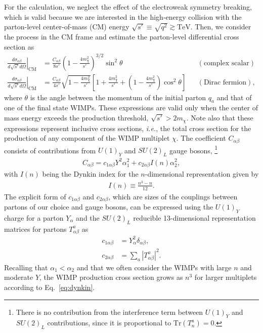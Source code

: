 \documentclass[12pt,twoside,book]{article}
\begin{document}
For the calculation, we neglect the effect of the electroweak symmetry breaking, which is valid because we are interested in the high-energy collision with the parton-level center-of-mass (CM) energy $\sqrt{s'} \equiv \sqrt{q^2} \gtrsim \mathrm{TeV}$.
Then, we consider the process in the CM frame and estimate the parton-level differential cross section as
\begin{align}
  \left. \frac{d \sigma_{\alpha \beta}}{d \sqrt{s'} d \Omega} \right|_{\text{CM}}
  &= \frac{C_{\alpha \beta}}{8 s'} \left( 1 - \frac{4 m_\chi^2}{s'} \right)^{3/2} \sin^2 \theta
  & &(\text{complex scalar}) \label{eq:parton_cross_section_scalar} \\
  \left. \frac{d \sigma_{\alpha \beta}}{d \sqrt{s'} d \Omega} \right|_{\text{CM}}
  &= \frac{C_{\alpha \beta}}{4 s'} \sqrt{1 - \frac{4 m_\chi^2}{s'}}
  \left[ 1 + \frac{4 m_\chi^2}{s'} + \left( 1 - \frac{4 m_\chi^2}{s'} \right) \cos^2 \theta \right]
  & &(\text{Dirac fermion}), \label{eq:parton_cross_section_fermion}
\end{align}
where $\theta$ is the angle between the momentum of the initial parton $q_a$ and that of one of the final state WIMPs.
These expressions are valid only when the center of mass energy exceeds the production threshold, $\sqrt{s'} > 2m_\chi$.
Note also that these expressions represent inclusive cross sections, \textit{i.e.}, the total cross section for the production of any component of the WIMP multiplet $\chi$.
The coefficient $C_{\alpha \beta}$ consists of contributions from $U(1)_Y$ and $SU(2)_L$ gauge bosons,
\footnote{
  There is no contribution from the interference term between $U(1)_Y$ and $SU(2)_L$ contributions, since it is proportional to $\mathrm{Tr} (T^a_n) = 0$.
}
\begin{align}
  C_{\alpha \beta} = c_{1 \alpha \beta} Y^2 \alpha_1^2
  + c_{2 \alpha \beta} I(n) \alpha_2^2,
\end{align}
with $I(n)$ being the Dynkin index for the $n$-dimensional representation given by
\begin{align}
  I(n) \equiv \frac{n^3-n}{12}.
  \label{eq:dynkin}
\end{align}
The explicit form of $c_{1 \alpha \beta}$ and $c_{2 \alpha \beta}$, which are sizes of the couplings between partons of our choice and gauge bosons, can be expressed using the $U(1)_Y$ charge for a parton $Y_\alpha$ and the $SU(2)_L$ reducible 13-dimensional representation matrices for partons $T^a_{\alpha \beta}$ as
\begin{align}
  c_{1 \alpha \beta} &= Y_\alpha^2 \delta_{\alpha \beta},\\
  c_{2 \alpha \beta} &= \sum_a \left| T^a_{\alpha \beta} \right|^2.
\end{align}
Recalling that $\alpha_1 < \alpha_2$ and that we often consider the WIMPs with large $n$ and moderate $Y$, the WIMP production cross section grows as $n^3$ for larger multiplets according to Eq.~\eqref{eq:dynkin}.
\end{document}
